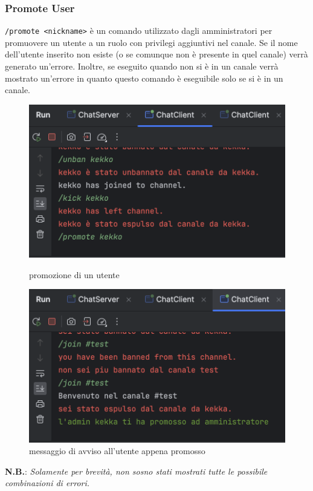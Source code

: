 \subsubsection{Promote User}
\item \texttt{/promote <nickname>} è un comando utilizzato dagli amministratori per promuovere un utente a un ruolo con privilegi aggiuntivi nel canale. Se il nome dell'utente inserito non esiste (o se comunque non è presente in quel canale) verrà generato un'errore. Inoltre, se eseguito quando non si è in un canale verrà mostrato un'errore in quanto questo comando è eseguibile solo se si è in un canale.
\begin{figure}[h]
  \centering
  \begin{minipage}{0.45\textwidth}
    \includegraphics[width=\linewidth]{imagens/outputs/12.png}
    \caption{promozione di un utente}
  \end{minipage}\hfill
  \begin{minipage}{0.45\textwidth}
    \includegraphics[width=\linewidth]{imagens/outputs/12_2.png}
    \caption{messaggio di avviso all'utente appena promosso}
  \end{minipage}\hfill
\end{figure}

\textbf{N.B.}: \textit{Solamente per brevità, non sosno stati mostrati tutte le possibile combinazioni di errori.}